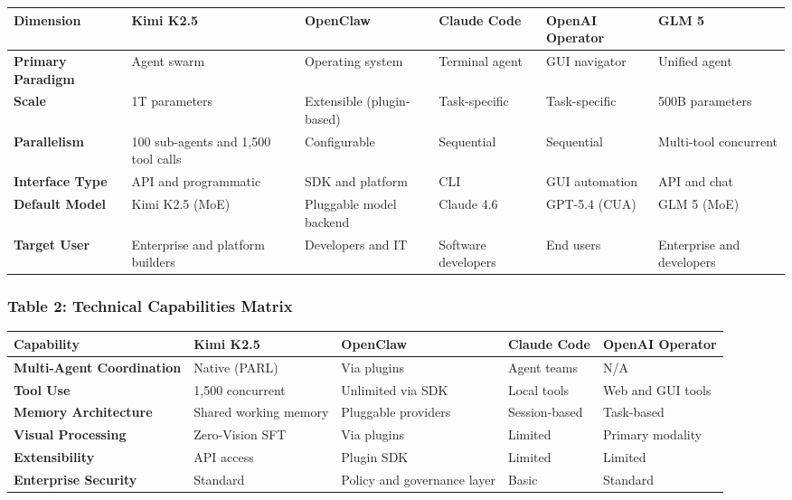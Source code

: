 \begin{table}[tbp]
\centering
\footnotesize
\begin{tabularx}{\textwidth}{YYYYYY}
\toprule
\textbf{Dimension} & \textbf{Kimi K2.5} & \textbf{OpenClaw} & \textbf{Claude Code} & \textbf{OpenAI Operator} & \textbf{GLM 5} \\
\midrule
\textbf{Primary Paradigm} & Agent swarm & Operating system & Terminal agent & GUI navigator & Unified agent \\
\textbf{Scale} & 1T parameters & Extensible (plugin-based) & Task-specific & Task-specific & 500B parameters \\
\textbf{Parallelism} & 100 sub-agents and 1,500 tool calls & Configurable & Sequential & Sequential & Multi-tool concurrent \\
\textbf{Interface Type} & API and programmatic & SDK and platform & CLI & GUI automation & API and chat \\
\textbf{Default Model} & Kimi K2.5 (MoE) & Pluggable model backend & Claude 4.6 & GPT-5.4 (CUA) & GLM 5 (MoE) \\
\textbf{Target User} & Enterprise and platform builders & Developers and IT & Software developers & End users & Enterprise and developers \\
\bottomrule
\end{tabularx}
\end{table}

\subsubsection{Table 2: Technical Capabilities Matrix}

\begin{table}[tbp]
\centering
\footnotesize
\begin{tabularx}{\textwidth}{YYYYY}
\toprule
\textbf{Capability} & \textbf{Kimi K2.5} & \textbf{OpenClaw} & \textbf{Claude Code} & \textbf{OpenAI Operator} \\
\midrule
\textbf{Multi-Agent Coordination} & Native (PARL) & Via plugins & Agent teams & N/A \\
\textbf{Tool Use} & 1,500 concurrent & Unlimited via SDK & Local tools & Web and GUI tools \\
\textbf{Memory Architecture} & Shared working memory & Pluggable providers & Session-based & Task-based \\
\textbf{Visual Processing} & Zero-Vision SFT & Via plugins & Limited & Primary modality \\
\textbf{Extensibility} & API access & Plugin SDK & Limited & Limited \\
\textbf{Enterprise Security} & Standard & Policy and governance layer & Basic & Standard \\
\bottomrule
\end{tabularx}
\end{table}

